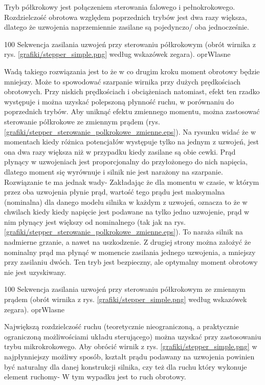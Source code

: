 \clearpage


Tryb półkrokowy jest połączeniem sterowania falowego i pełnokrokowego. Rozdzielczość obrotowa względem poprzednich trybów jest dwa razy większa, dlatego że uzwojenia naprzemiennie zasilane są pojedynczo/ oba jednocześnie.

		{100}
		{Sekwencja zasilania uzwojeń przy sterowaniu półkrokowym (obrót wirnika z rys. \ref{grafiki/stepper_simple.png} według wskazówek zegara).}
		{oprWlasne}
		
Wadą takiego rozwiązania jest to że w co drugim kroku moment obrotowy będzie mniejszy. Może to spowodować szarpanie wirnika przy dużych prędkościach obrotowych. Przy niskich prędkościach i obciążeniach natomiast, efekt ten rzadko występuje i można uzyskać polepszoną płynność ruchu, w porównaniu do poprzednich trybów. Aby uniknąć efektu zmiennego momentu, można zastosować sterowanie półkrokowe ze zmiennym prądem (rys. \ref{grafiki/stepper_sterowanie_polkrokowe_zmienne.eps}). Na rysunku widać że w momentach kiedy różnica potencjałów występuje tylko na jednym z uzwojeń, jest ona dwa razy większa niż w przypadku kiedy zasilane są obie cewki. Prąd płynący w uzwojeniach jest proporcjonalny do przyłożonego do nich napięcia, dlatego moment się wyrównuje i silnik nie jest narażony na szarpanie. Rozwiązanie te ma jednak wady- Zakładając że dla momentu w czasie, w którym przez oba uzwojenia płynie prąd, wartość tego prądu jest maksymalna (nominalna) dla danego modelu silnika w każdym z uzwojeń, oznacza to że w chwilach kiedy kiedy napięcie jest podawane na tylko jedno uzwojenie, prąd w nim płynący jest większy od nominalnego (tak jak na rys. \ref{grafiki/stepper_sterowanie_polkrokowe_zmienne.eps}). To naraża silnik na nadmierne grzanie, a nawet na uszkodzenie. Z drugiej strony można założyć że nominalny prąd ma płynąć w momencie zasilania jednego uzwojenia, a mniejszy przy zasilaniu dwóch. Ten tryb jest bezpieczny, ale optymalny moment obrotowy nie jest uzyskiwany.

		{100}
		{Sekwencja zasilania uzwojeń przy sterowaniu półkrokowym ze zmiennym prądem (obrót wirnika z rys. \ref{grafiki/stepper_simple.png} według wskazówek zegara).}
		{oprWlasne}
		

Największą rozdzielczość ruchu (teoretycznie nieograniczoną, a praktycznie ograniczoną możliwościami układu sterującego) można uzyskać przy zastosowaniu trybu mikrokrokowego. Aby obrócić wirnik z rys. \ref{grafiki/stepper_simple.png} w najpłynniejszy możliwy sposób, kształt prądu podawany na uzwojenia powinien być naturalny dla danej konstrukcji silnika, czy też dla ruchu który wykonuje element ruchomy- W tym wypadku jest to ruch obrotowy. 

